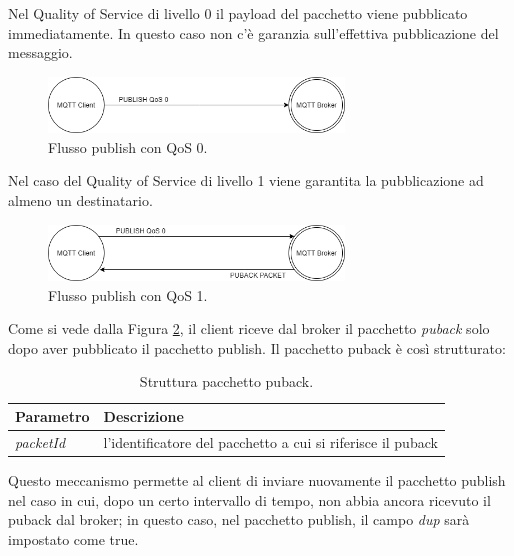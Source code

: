 \documentclass[Lau,binding=0.6cm,noexaminfo=true]{sapthesis}
\begin{document}
\begin{large}
Nel Quality of Service di livello 0 il payload del pacchetto viene pubblicato immediatamente. In questo caso non c'è garanzia sull'effettiva pubblicazione del messaggio.
\begin{figure}[h]
\centering
\includegraphics[width=0.7\textwidth]{images/publish-qos0.png}
\caption{Flusso publish con QoS 0.}
\label{fig:qos-0pub}
\end{figure}

Nel caso del Quality of Service di livello 1 viene garantita la pubblicazione ad almeno un destinatario.
\begin{figure}[h]
\centering
\includegraphics[width=0.7\textwidth]{images/publish-qos1.png}
\caption{Flusso publish con QoS 1.}
\label{fig:qos-1pub}
\end{figure}

Come si vede dalla Figura \ref{fig:qos-1pub}, il client riceve dal broker il pacchetto \textit{puback} solo dopo aver pubblicato il pacchetto publish. 
Il pacchetto puback è così strutturato:
\begin{table}[h]
\caption{Struttura pacchetto puback.}
\label{tab:puback}
\begin{tabular}{lp{}}
\toprule
\textbf{Parametro} & \textbf{Descrizione} \\
\midrule
\textit{packetId} & l'identificatore del pacchetto a cui si riferisce il puback \\
\bottomrule
\end{tabular}
\end{table}

Questo meccanismo permette al client di inviare nuovamente il pacchetto publish nel caso in cui, dopo un certo intervallo di tempo, non abbia ancora ricevuto il puback dal broker; in questo caso, nel pacchetto publish, il campo \textit{dup} sarà impostato come true.
\end{large}



\end{document}
